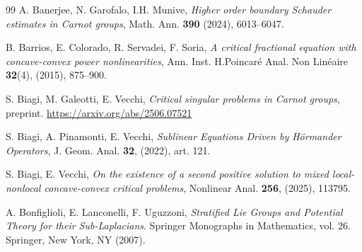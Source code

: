 \documentclass[11pt]{amsart}
\numberwithin{equation}{section} %
\theoremstyle{definition}
\begin{document}
\begin{thebibliography}{99}
	A. Banerjee, N. Garofalo, I.H. Munive, 
	{\em Higher order boundary Schauder estimates in Carnot groups}, 
	Math. Ann. {\bf 390} (2024), 6013--6047.
	
	B. Barrios, E. Colorado, R. Servadei, F. Soria, 
	{\em A critical fractional equation with concave-convex
		power nonlinearities}, 
	Ann. Inst. H.Poincar\'{e} Anal. Non Lin\'{e}aire {\bf 32}(4), (2015), 875--900.
	
	
	S. Biagi, M. Galeotti, E. Vecchi,
	{\em Critical singular problems in Carnot groups}, preprint. \url{https://arxiv.org/abs/2506.07521}
	
	S. Biagi, A. Pinamonti, E. Vecchi, 
	{\em Sublinear Equations Driven by Hörmander Operators}, J. Geom. Anal. {\bf 32}, (2022), art. 121.
	
	S. Biagi, E. Vecchi,
	{\em On the existence of a second positive solution to mixed local-nonlocal concave-convex critical problems}, Nonlinear Anal. {\bf 256}, (2025), 113795. 
	
	
	
	
	
	
	A. Bonfiglioli, E. Lanconelli, F. Uguzzoni, 
	{\em Stratified Lie Groups and Potential Theory for their
		Sub-Laplacians}. Springer Monographs in Mathematics, vol. 26. Springer, New York, NY (2007).
	

\end{thebibliography}
\end{document}
